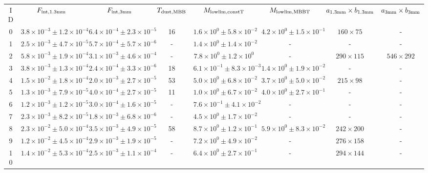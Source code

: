 \begin{table}
\begin{tabular}{cccccccc}
ID & $F_{\rm int, 1.3mm}$ & $F_{\rm int, 3mm}$ & $T_{\rm dust, MBB}$ & $M_{\rm lowlim, constT}$ & $M_{\rm lowlim, MBBT}$ & $a_{\rm 1.3mm}\times b_{\rm 1.3mm}$ & $a_{\rm 3mm}\times b_{\rm 3mm}$ \\
0 & $3.8\times10^{-3}\pm 1.2\times10^{-4}$ & $6.4\times10^{-4}\pm 2.3\times10^{-5}$ & 16 & $1.6\times10^{0}\pm 5.8\times10^{-2}$ & $4.2\times10^{0}\pm 1.5\times10^{-1}$ & $160\times 75$ & - \\
1 & $2.5\times10^{-3}\pm 4.7\times10^{-5}$ & $5.7\times10^{-4}\pm 5.7\times10^{-6}$ & - & $1.4\times10^{0}\pm 1.4\times10^{-2}$ & - & - & - \\
2 & $5.8\times10^{-3}\pm 1.9\times10^{-4}$ & $3.1\times10^{-3}\pm 4.6\times10^{-4}$ & - & $7.8\times10^{0}\pm 1.2\times10^{0}$ & - & $290\times 115$ & $546\times 292$ \\
3 & $3.8\times10^{-3}\pm 1.3\times10^{-4}$ & $2.4\times10^{-4}\pm 3.3\times10^{-6}$ & 18 & $6.1\times10^{-1}\pm 8.3\times10^{-3}$ & $1.4\times10^{0}\pm 1.9\times10^{-2}$ & - & - \\
4 & $1.5\times10^{-2}\pm 1.8\times10^{-4}$ & $2.0\times10^{-3}\pm 2.7\times10^{-5}$ & 53 & $5.0\times10^{0}\pm 6.8\times10^{-2}$ & $3.7\times10^{0}\pm 5.0\times10^{-2}$ & $215\times 98$ & - \\
5 & $1.3\times10^{-3}\pm 7.9\times10^{-5}$ & $4.0\times10^{-4}\pm 2.7\times10^{-5}$ & 11 & $1.0\times10^{0}\pm 6.7\times10^{-2}$ & $4.0\times10^{0}\pm 2.7\times10^{-1}$ & - & - \\
6 & $1.2\times10^{-3}\pm 1.2\times10^{-5}$ & $3.0\times10^{-4}\pm 1.6\times10^{-5}$ & - & $7.6\times10^{-1}\pm 4.1\times10^{-2}$ & - & - & - \\
7 & $2.3\times10^{-3}\pm 8.2\times10^{-5}$ & $1.8\times10^{-3}\pm 6.8\times10^{-6}$ & - & $4.5\times10^{0}\pm 1.7\times10^{-2}$ & - & - & - \\
8 & $2.3\times10^{-2}\pm 5.0\times10^{-4}$ & $3.5\times10^{-3}\pm 4.9\times10^{-5}$ & 58 & $8.7\times10^{0}\pm 1.2\times10^{-1}$ & $5.9\times10^{0}\pm 8.3\times10^{-2}$ & $242\times 200$ & - \\
9 & $1.2\times10^{-2}\pm 4.5\times10^{-4}$ & $2.9\times10^{-3}\pm 1.9\times10^{-5}$ & - & $7.2\times10^{0}\pm 4.9\times10^{-2}$ & - & $276\times 158$ & - \\
10 & $1.4\times10^{-2}\pm 5.3\times10^{-4}$ & $2.5\times10^{-3}\pm 1.1\times10^{-4}$ & - & $6.4\times10^{0}\pm 2.7\times10^{-1}$ & - & $294\times 144$ & - \\

\end{tabular}
\end{table}

